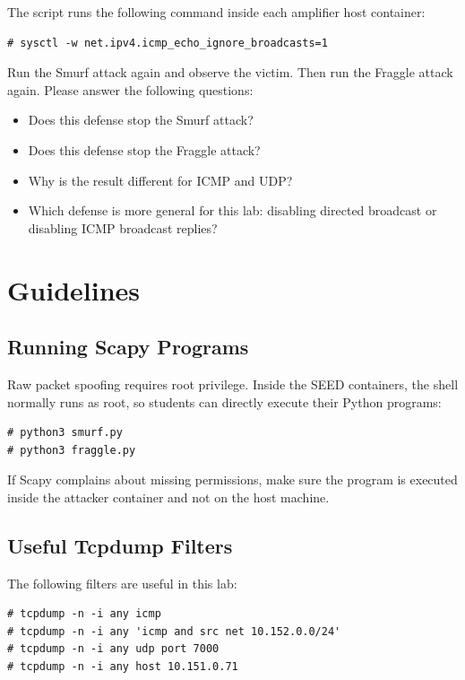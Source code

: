 The script runs the following command inside each amplifier host container:

\begin{lstlisting}
# sysctl -w net.ipv4.icmp_echo_ignore_broadcasts=1
\end{lstlisting}

Run the Smurf attack again and observe the victim. Then run the Fraggle attack
again. Please answer the following questions:

\begin{itemize}[noitemsep]
\item Does this defense stop the Smurf attack?
\item Does this defense stop the Fraggle attack?
\item Why is the result different for ICMP and UDP?
\item Which defense is more general for this lab: disabling directed broadcast
      or disabling ICMP broadcast replies?
\end{itemize}


\section{Guidelines}

\subsection{Running Scapy Programs}

Raw packet spoofing requires root privilege. Inside the SEED containers, the
shell normally runs as root, so students can directly execute their Python
programs:

\begin{lstlisting}
# python3 smurf.py
# python3 fraggle.py
\end{lstlisting}

If Scapy complains about missing permissions, make sure the program is executed
inside the attacker container and not on the host machine.


\subsection{Useful Tcpdump Filters}

The following filters are useful in this lab:

\begin{lstlisting}
# tcpdump -n -i any icmp
# tcpdump -n -i any 'icmp and src net 10.152.0.0/24'
# tcpdump -n -i any udp port 7000
# tcpdump -n -i any host 10.151.0.71
\end{lstlisting}


